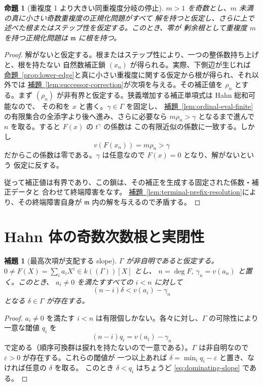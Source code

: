 \documentclass[11pt,uplatex,dvipdfmx]{jsarticle}
\newcommand{\Val}{v}
\newcommand{\namedref}[2]{\hyperref[#2]{#1~\ref*{#2}}}
\theoremstyle{proofnote}
\newtheorem{proposition}[theorem]{命題}
\newtheorem{lemma}[theorem]{補題}
\begin{document}
\begin{proposition}[重複度 1 より大きい同重複度分岐の停止]
\label{prop:transfinite-termination}
  \(m>1\) を奇数とし、\(m\) 未満の真に小さい奇数重複度の正規化問題がすべて
  解を持つと仮定し、さらに上で述べた根またはステップ性を仮定する。このとき、零が
  剰余根として重複度 \(m\) を持つ正規化問題は \(\mathfrak m\) に根を持つ。
\end{proposition}
\begin{proof}
  解がないと仮定する。根またはステップ性により、一つの整係数持ち上げと、根を持たない
  自然数補正鎖 \((x_n)\) が得られる。実際、下側辺が生じれば
  \namedref{命題}{prop:lower-edge}と真に小さい重複度に関する仮定から根が得られ、それ以外では
  \namedref{補題}{lem:successor-correction}が次項を与える。その補正値を \(\rho_n\) とする。まず
  \((\rho_n)\) が非有界と仮定する。狭義増加する補正単項式は Hahn 総和可能なので、
  その和を \(x\) と書く。\(\gamma\in\Gamma\) を固定し、
  \namedref{補題}{lem:ordinal-eval-finite}の有限集合の全添字より後へ進み、さらに必要なら
  \(m\rho_n>\gamma\) となるまで進んで \(n\) を取る。すると \(F(x)\) の \(t^\gamma\) の係数は
  この有限近似の係数に一致する。しかし
  \[
    \Val(F(x_n))=m\rho_n>\gamma
  \]
  だからこの係数は零である。\(\gamma\) は任意なので \(F(x)=0\) となり、解がないという
  仮定に反する。

  従って補正値は有界であり、この鎖は、その補正を生成する固定された係数・補正データと
  合わせて終端障害をなす。
  \namedref{補題}{lem:terminal-prefix-resolution}により、その終端障害自身が
  \(\mathfrak m\) 内の解を与えるので矛盾する。
\end{proof}

\section{Hahn 体の奇数次数根と実閉性}
\label{sec:hahn-conclusion}

\begin{lemma}[最高次項が支配する slope]
\label{lem:dominating-slope}
  \(\Gamma\) が非自明であると仮定する。
  \(0\ne F(X)=\sum_i a_iX^i\in k((\Gamma))[X]\) とし、
  \(n=\deg F\), \(\gamma_n=\Val(a_n)\) と置く。このとき、
  \(a_i\ne0\) を満たすすべての \(i<n\) に対して
  \[
    (n-i)\delta<\Val(a_i)-\gamma_n
    \tag{DS}\label{eq:dominating-slope}
  \]
  となる \(\delta\in\Gamma\) が存在する。
\end{lemma}
\begin{proof}
  \(a_i\ne0\) を満たす \(i<n\) は有限個しかない。各々に対し、\(\Gamma\) の可除性により
  一意な閾値 \(q_i\) を
  \[
    (n-i)q_i=\Val(a_i)-\gamma_n
  \]
  で定める（順序可換群は捩れを持たないので一意である）。\(\Gamma\) は非自明なので
  \(\varepsilon>0\) が存在する。これらの閾値が
  一つ以上あれば \(\delta=\min_i q_i-\varepsilon\) と置き、なければ任意の \(\delta\) を取る。
  このとき \(\delta<q_i\) はちょうど \eqref{eq:dominating-slope} である。
\end{proof}
\end{document}
